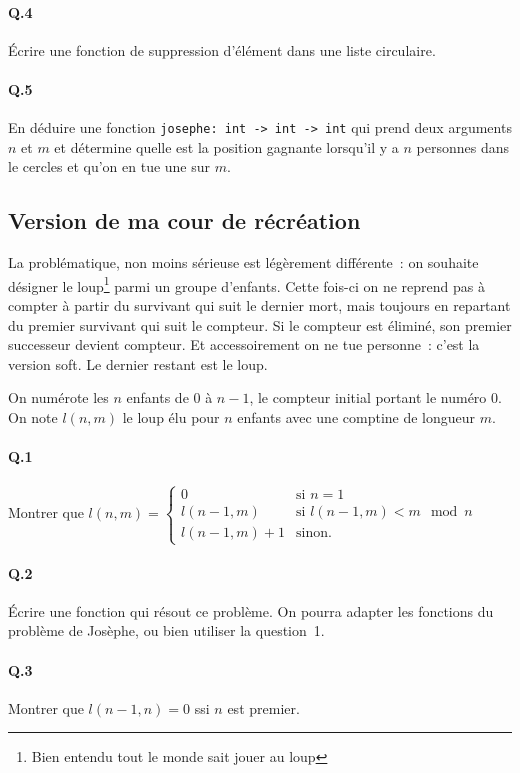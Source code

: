 \documentclass[10pt,a4paper]{article}
\begin{document}
\paragraph{Q.4} Écrire une fonction de suppression d'élément dans une liste circulaire.

\paragraph{Q.5} En déduire une fonction \texttt{josephe: int -> int -> int} qui prend deux arguments $n$ et $m$ et détermine quelle est la position gagnante
lorsqu'il y a $n$ personnes dans le cercles et qu'on en tue une sur $m$.

\subsection{Version de ma cour de récréation}
La problématique, non moins sérieuse est légèrement différente~: on souhaite désigner le loup\footnote{Bien entendu tout le monde sait jouer au loup} parmi un groupe d'enfants.
Cette fois-ci on ne reprend pas à compter à partir du survivant qui suit le dernier mort, mais toujours en repartant du premier survivant qui suit le compteur. Si le compteur est éliminé, son premier successeur devient compteur.
Et accessoirement on ne tue personne~: c'est la version soft. Le dernier restant est le loup.

On numérote les $n$ enfants de $0$ à $n-1$, le compteur initial portant le numéro $0$. On note $l(n,m)$ le loup élu pour $n$ enfants avec une comptine de longueur $m$.

\paragraph{Q.1} Montrer que $l(n,m) = \left\{
	\begin{array}{ll}
		0  & \mbox{si } n = 1 \\
		l(n-1,m) & \mbox{si } l(n-1,m) < m \mod n \\
		l(n-1,m) + 1 & \mbox{sinon}.
	\end{array}
\right. $
\paragraph{Q.2} Écrire une fonction qui résout ce problème. On pourra adapter les fonctions du problème de Josèphe, ou bien utiliser la question 1.
\paragraph{Q.3} Montrer que $l(n-1,n) = 0$ ssi $n$ est premier.
\end{document}
